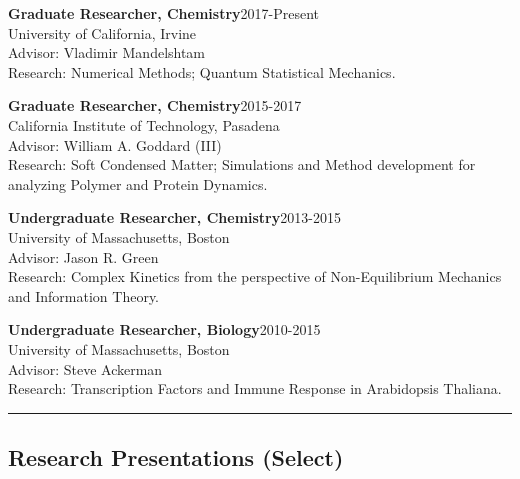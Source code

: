 \documentclass[letterpaper]{article}
\renewenvironment{itemize}{
  \begin{list}{}{
    \setlength{\leftmargin}{1.5em}
  }
}{
  \end{list}
}
\begin{document}
\begin{itemize}

\item \textbf{Graduate Researcher, Chemistry}\hfill 2017-Present\\
      University of California, Irvine\\
      Advisor: Vladimir Mandelshtam\\
      Research: Numerical Methods; Quantum Statistical Mechanics.

\item \textbf{Graduate Researcher, Chemistry}\hfill 2015-2017\\
      California Institute of Technology, Pasadena\\
      Advisor: William A. Goddard (III) \\
      Research: Soft Condensed Matter; Simulations and Method development for analyzing
      Polymer and Protein Dynamics.

\item \textbf{Undergraduate Researcher, Chemistry}\hfill 2013-2015\\
      University of Massachusetts, Boston\\
      Advisor: Jason R. Green\\
      Research: Complex Kinetics from the perspective of
      Non-Equilibrium Mechanics and Information Theory.

\item \textbf{Undergraduate Researcher, Biology}\hfill 2010-2015\\
      University of Massachusetts, Boston\\
      Advisor: Steve Ackerman \\
      Research: Transcription Factors and Immune Response in Arabidopsis Thaliana.
\end{itemize}

\vspace{0.1in}
\hrule

\subsection*{Research Presentations (Select)}
\end{document}
